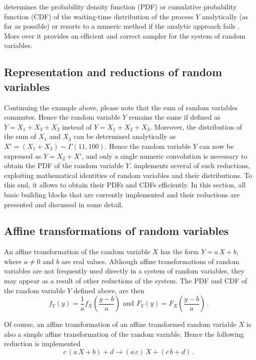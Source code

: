  determines the probability density function (PDF) or cumulative probability function
(CDF) of the waiting-time distribution of the process $Y$ analytically (as far as
possible) or resorts to a numeric method if the analytic approach fails 
\cite[see][for examples of numerical approximations outperforming the stochastic simulation approach]{Thomas2012, Thomas2013}.
More over it provides an efficient and correct sampler for the system of random variables.

\subsection{Representation and reductions of random variables}
Continuing the example above, please note that the sum of random variables commutes. Hence the
random variable $Y$ remains the same if defined as $Y = X_1 + X_3 + X_2$ instead of 
$Y = X_1 + X_2 + X_3$. Moreover, the 
distribution of the sum of $X_1$ and $X_3$ can be determined analytically as 
$X' = (X_1+X_3)\sim\Gamma(11,100)$. Hence the random variable $Y$ can now be expressed as 
$Y = X_2 + X'$, and only a single numeric convolution is necessary to obtain the PDF of the
random variable $Y$.  implements several of such reductions, exploiting mathematical
identities of random variables and their distributions. To this end, it allows to obtain their PDFs and 
CDFs efficiently. In this section, all basic building blocks that are currently implemented and their 
reductions are presented and discussed in some detail.

\subsection{Affine transformations of random variables}
An affine transformation of the random variable $X$ has the form $Y = a\,X+b$, where $a\neq 0$
and $b$ are real values. Although affine transformations of random variables are not frequently
used directly in a system of random variables, they may appear as a result of other reductions
of the system. The PDF and CDF of the random variable $Y$ defined above, are then 
\begin{equation}
 f_Y(y) = \frac{1}{a}f_X\left(\frac{y-b}{a}\right)\text{ and }
 F_Y(y) = F_X\left(\frac{y-b}{a}\right)\,. \nonumber
\end{equation}

Of course, an affine transformation of an affine transformed random variable $X$ is also a simple 
affine transformation of the random variable. Hence the following reduction is implemented
\begin{equation}
 c\,(a\,X+b)+d \longrightarrow (a\,c)\,X+(c\,b+d)\,.\nonumber
\end{equation}

